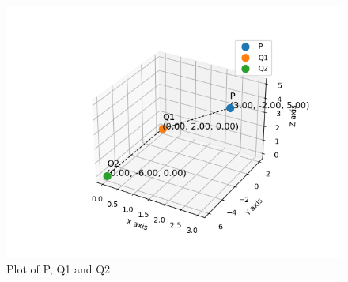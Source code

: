 \documentclass[journal]{IEEEtran}
\begin{document}
    \begin{figure}[h]
    \centering
    \includegraphics[width=\columnwidth]{figs/Figure_1.png}
    \caption{Plot of P, Q1 and Q2}
 \end{figure}
\end{document}
